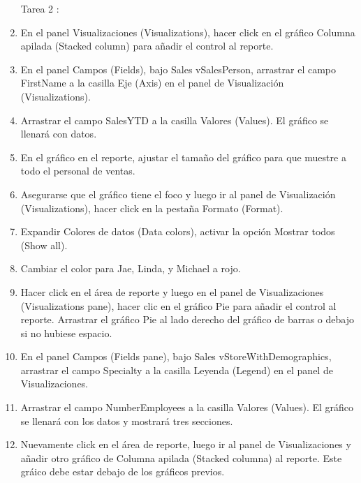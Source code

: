 \begin{enumerate}[1.]
    \item[Tarea 2 :]

    \item En el panel Visualizaciones (Visualizations), hacer click en el gráfico Columna apilada (Stacked column) para añadir el control al reporte. 
    
    \item  En el panel Campos (Fields), bajo Sales vSalesPerson, arrastrar el campo FirstName a la casilla Eje (Axis) en el panel de Visualización (Visualizations).

    \item   Arrastrar el campo SalesYTD a la casilla Valores (Values). El gráfico se llenará con datos.
    
    \item   En el gráfico en el reporte, ajustar el tamaño del gráfico para que muestre a todo el personal de ventas.
    
    \item  Asegurarse que el gráfico tiene el foco y luego ir al panel de Visualización (Visualizations), hacer click en la pestaña Formato (Format).
    
    \item  Expandir Colores de datos (Data colors), activar la opción Mostrar todos (Show all).
    
    \item  Cambiar el color para Jae, Linda, y Michael a rojo.
    
    \item  Hacer click en el área de reporte y luego en el panel de Visualizaciones (Visualizations pane), hacer clic en el gráfico Pie para añadir el control al reporte. Arrastrar el gráfico Pie al lado derecho del gráfico de barras o debajo si no hubiese espacio.
    
    \item   En el panel Campos (Fields pane), bajo Sales vStoreWithDemographics, arrastrar el campo Specialty a la casilla Leyenda (Legend) en el panel de Visualizaciones.
    
    \item   Arrastrar el campo NumberEmployees a la casilla Valores (Values). El gráfico se llenará con los datos y mostrará tres secciones.
    
    \item  Nuevamente click en el área de reporte, luego ir al panel de Visualizaciones y añadir otro gráfico de Columna apilada (Stacked columna) al reporte. Este gráico debe estar debajo de los gráficos previos.
    

\end{enumerate}
